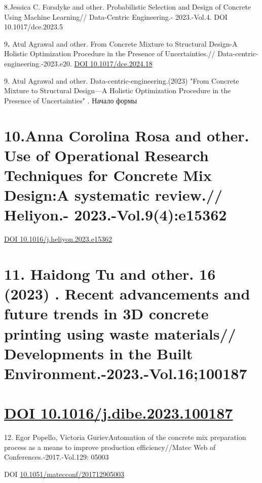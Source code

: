 \documentclass[
]{article}
\begin{document}
8.Jessica C. Forsdyke and other. Probabilistic Selection and Design of
Concrete Using Machine Learning// Data-Centric Engineering.-
2023.-Vol.4. DOI 10.1017/dce.2023.5

9\textbf{.} Atul Agrawal and other. From Concrete Mixture to Structural
Design-A Holistic Optimization Procedure in the Presence of
Uncertainties.// Data-centric-engineering.-2023.e20.
\href{https://doi.org/10.1017/dce.2024.18}{DOI 10.1017/dce.2024.18}

9. Atul Agrawal and other. Data-centric-engineering.(2023) "From
Concrete Mixture to Structural Design---A Holistic Optimization
Procedure in the Presence of Uncertainties" . Начало формы

\section{10.Anna Corolina Rosa and other. Use of Operational Research
Techniques for Concrete Mix Design:A systematic review.// Heliyon.-
2023.-Vol.9(4):e15362}\label{anna-corolina-rosa-and-other.-use-of-operational-research-techniques-for-concrete-mix-designa-systematic-review.-heliyon.--2023.-vol.94e15362}

\href{https://doi.org/10.1016/j.heliyon.2023.e15362}{DOI
10.1016/j.heliyon.2023.e15362}

\section{11. Haidong Tu and other. 16 (2023) . Recent advancements and
future trends in 3D concrete printing using waste materials//
Developments in the Built
Environment.-2023.-Vol.16;100187}\label{haidong-tu-and-other.-16-2023-.-recent-advancements-and-future-trends-in-3d-concrete-printing-using-waste-materials-developments-in-the-built-environment.-2023.-vol.16100187}

\section{\texorpdfstring{\href{https://doi.org/10.1016/j.dibe.2023.100187}{DOI
10.1016/j.dibe.2023.100187}}{DOI 10.1016/j.dibe.2023.100187}}\label{doi-10.1016j.dibe.2023.100187}

12. Egor Popello, Victoria GurievAutomation of the concrete mix
preparation process as a means to improve production efficiency//Matec
Web of Conferences.-2017.-Vol.129: 05003

DOI
\href{http://dx.doi.org/10.1051/matecconf/201712905003}{10.1051/matecconf/201712905003}
\end{document}
